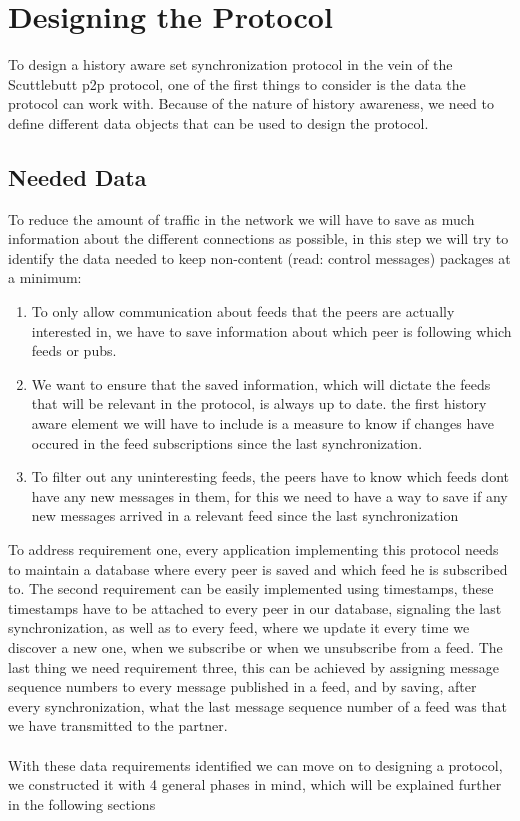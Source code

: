 \chapter{Designing the Protocol}

To design a history aware set synchronization protocol in the vein of the Scuttlebutt p2p protocol, one of the first things to consider is the data the protocol can work with. Because of the nature of history awareness, we need to define different data objects that can be used to design the protocol. 

\section{Needed Data}
\label{sec:Data_Identification}

To reduce the amount of traffic in the network we will have to save as much information about the different connections as possible, in this step we will try to identify the data needed to keep non-content (read: control messages) packages at a minimum:

\begin{enumerate}
	\item To only allow communication about feeds that the peers are actually interested in, we have to save information about which peer is following which feeds or pubs.
	\item We want to ensure that the saved information, which will dictate the feeds that will be relevant in the protocol, is always up to date. the first history aware element we will have to include is a measure to know if changes have occured in the feed subscriptions since the last synchronization.
	\item To filter out any uninteresting feeds, the peers have to know which feeds dont have any new messages in them, for this we need to have a way to save if any new messages arrived in a relevant feed since the last synchronization
\end{enumerate}

To address requirement one, every application implementing this protocol needs to maintain a database where every peer is saved and which feed he is subscribed to. The second requirement can be easily implemented using timestamps, these timestamps have to be attached to every peer in our database, signaling the last synchronization, as well as to every feed, where we update it every time we discover a new one, when we subscribe or when we unsubscribe from a feed. The last thing we need requirement three, this can be achieved by assigning message sequence numbers to every message published in a feed, and by saving, after every synchronization, what the last message sequence number of a feed was that we have transmitted to the partner.
\\
\\
With these data requirements identified we can move on to designing a protocol, we constructed it with 4 general phases in mind, which will be explained further in the following sections

